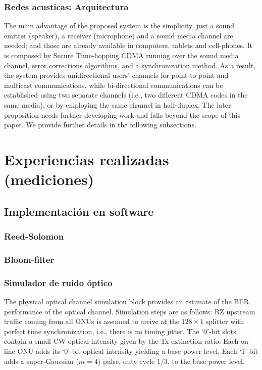\documentclass[12pt,twoside,openright]{moddalthesis}
\begin{document}
\subsubsection{Redes acusticas: Arquitectura}
The main advantage of the proposed system is the simplicity, just a sound emitter (speaker), a receiver (microphone) and a sound media channel are needed; and those are already available in computers, tablets and cell-phones. It is composed by Secure Time-hopping CDMA running over the sound media channel, error corrections algorithms, and a synchronization method. As a result, the system provides unidirectional users’ channels for point-to-point and multicast communications, while bi-directional communications can be established using two separate channels (i.e., two different CDMA codes in the same media), or by employing the same channel in half-duplex. The later proposition needs further developing work and falls beyond the scope of this paper.
We provide further details in the following subsections.


\section{Experiencias realizadas (mediciones)}
\subsection{Implementación en software}
\subsubsection{Reed-Solomon}
\subsubsection{Bloom-filter}
\subsubsection{Simulador de ruido óptico}
The physical optical channel simulation block provides an estimate of
the BER performance of the optical channel. Simulation steps are as
follows: RZ upstream traffic coming from all ONUs is assumed to arrive
at the $128\times1$ splitter with perfect time synchronization, i.e., there is no timing jitter. 
The `0'-bit slots contain a small CW optical intensity given by the Tx extinction ratio. 
Each on-line ONU adds its `0'-bit optical intensity yielding a base power level.
Each `1'-bit adds a super-Gaussian ($m=4$) pulse, duty cycle $1/3$, to the base power level. %
 
\end{document}
